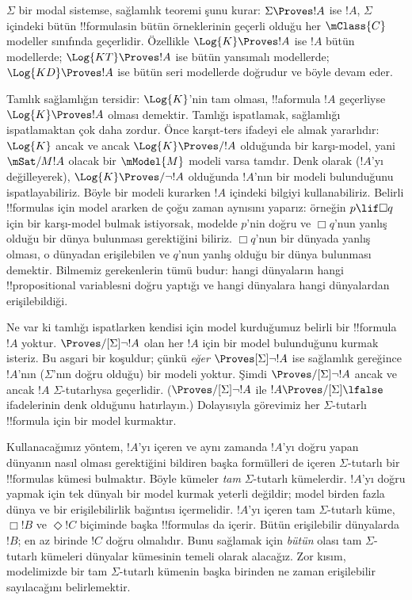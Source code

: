 \documentclass[../../../include/open-logic-section]{subfiles}
\begin{document}


$\Sigma$ bir modal sistemse, sağlamlık teoremi şunu kurar: $\Sigma\Proves !A$
ise $!A$, $\Sigma$ içindeki bütün !!{formula}s{}in bütün örneklerinin geçerli
olduğu her $\mClass{C}$ modeller sınıfında geçerlidir. Özellikle
$\Log{K}\Proves !A$ ise $!A$ bütün modellerde; $\Log{KT}\Proves !A$ ise
bütün yansımalı modellerde; $\Log{KD}\Proves !A$ ise bütün seri modellerde
doğrudur ve böyle devam eder.

Tamlık sağlamlığın tersidir: $\Log{K}$'nin tam olması, !!a{formula} $!A$
geçerliyse $\Log{K}\Proves !A$ olması demektir. Tamlığı ispatlamak,
sağlamlığı ispatlamaktan çok daha zordur. Önce karşıt-ters ifadeyi ele almak
yararlıdır: $\Log{K}$ ancak ve ancak $\Log{K}\Proves/ !A$ olduğunda bir
karşı-model, yani $\mSat/{M}{!A}$ olacak bir $\mModel{M}$ modeli varsa
tamdır. Denk olarak ($!A$'yı değilleyerek), $\Log{K}\Proves/\lnot !A$
olduğunda $!A$'nın bir modeli bulunduğunu ispatlayabiliriz. Böyle bir modeli
kurarken $!A$ içindeki bilgiyi kullanabiliriz. Belirli !!{formula}s için
model ararken de çoğu zaman aynısını yaparız: örneğin $p\lif\Box q$ için bir
karşı-model bulmak istiyorsak, modelde $p$'nin doğru ve $\Box q$'nun yanlış
olduğu bir dünya bulunması gerektiğini biliriz. $\Box q$'nun bir dünyada
yanlış olması, o dünyadan erişilebilen ve $q$'nun yanlış olduğu bir dünya
bulunması demektir. Bilmemiz gerekenlerin tümü budur: hangi dünyaların hangi
!!{propositional variable}s{}ni doğru yaptığı ve hangi dünyalara hangi
dünyalardan erişilebildiği.

Ne var ki tamlığı ispatlarken kendisi için model kurduğumuz belirli bir
!!{formula} $!A$ yoktur. $\Proves/[\Sigma]\lnot !A$ olan her $!A$ için bir
model bulunduğunu kurmak isteriz. Bu asgari bir koşuldur; çünkü
\emph{eğer} $\Proves[\Sigma]\lnot !A$ ise sağlamlık gereğince $!A$'nın
($\Sigma$'nın doğru olduğu) bir modeli yoktur. Şimdi
$\Proves/[\Sigma]\lnot !A$ ancak ve ancak $!A$ $\Sigma$-tutarlıysa
geçerlidir. ($\Proves/[\Sigma]\lnot !A$ ile
$!A\Proves/[\Sigma]\lfalse$ ifadelerinin denk olduğunu hatırlayın.)
Dolayısıyla görevimiz her $\Sigma$-tutarlı !!{formula} için bir model
kurmaktır.

Kullanacağımız yöntem, $!A$'yı içeren ve aynı zamanda $!A$'yı doğru yapan
dünyanın nasıl olması gerektiğini bildiren başka formülleri de içeren
$\Sigma$-tutarlı bir !!{formula}s kümesi bulmaktır. Böyle kümeler
\emph{tam} $\Sigma$-tutarlı kümelerdir. $!A$'yı doğru yapmak için tek
dünyalı bir model kurmak yeterli değildir; model birden fazla dünya ve bir
erişilebilirlik bağıntısı içermelidir. $!A$'yı içeren tam $\Sigma$-tutarlı
küme, $\Box !B$ ve $\Diamond !C$ biçiminde başka !!{formula}s da içerir.
Bütün erişilebilir dünyalarda $!B$; en az birinde $!C$ doğru olmalıdır.
Bunu sağlamak için \emph{bütün} olası tam $\Sigma$-tutarlı kümeleri dünyalar
kümesinin temeli olarak alacağız. Zor kısım, modelimizde bir tam
$\Sigma$-tutarlı kümenin başka birinden ne zaman erişilebilir sayılacağını
belirlemektir.
\end{document}
